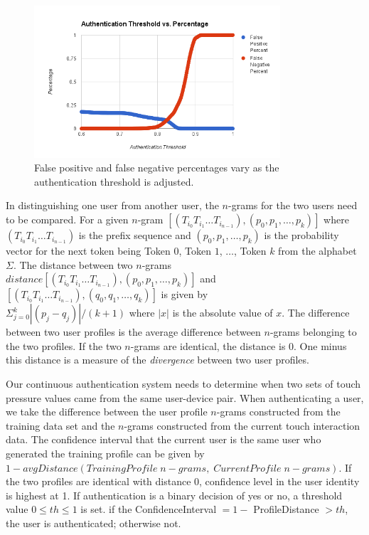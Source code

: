 \documentclass{acm_proc_article-sp}
\begin{document}
\begin{figure}
\centering
\includegraphics[width=3.6in]{threshold_vs_percentages.png}
\caption{False positive and false negative percentages vary as the authentication threshold is adjusted.}
\label{fig:threshold_vs_percentages}
\end{figure}

In distinguishing one user from another user, 
the $n$-grams for the two users need to be compared. 
For a given $n$-gram 
$[(T_{i_0} T_{i_1} \dots T_{i_{n-1}}), (p_0, p_1, \dots, p_k)]$ where 
$(T_{i_0} T_{i_1} \dots T_{i_{n-1}})$ is the prefix sequence and 
$(p_0, p_1, \dots, p_k)$ is the
probability vector for the next token being 
Token $0$, Token $1$, $\dots$, Token $k$ from the alphabet $\Sigma$.
The distance between two $n$-grams 
$distance[(T_{i_0} T_{i_1} \dots T_{i_{n-1}}), (p_0, p_1, \dots, p_k)]$ and \\
$[(T_{i_0} T_{i_1} \dots T_{i_{n-1}}), (q_0, q_1, \dots, q_k)]$ is given by \\
$\Sigma_{j=0}^k|(p_j - q_j)|/(k+1)$ where $|x|$ is the absolute value of $x$.
The difference between two user profiles is 
the average difference between $n$-grams belonging
to the two profiles.
If the two $n$-grams are identical, the distance is 0.
One minus this distance is a measure of the {\it divergence} between two user profiles.

Our continuous authentication system needs to determine 
when two sets of touch pressure values came from the same user-device pair. 
When authenticating a user, we take the difference between
the user profile $n$-grams constructed from the training data set 
and the $n$-grams constructed from the current touch interaction data.
The confidence interval that the current user is the same 
user who generated the training profile can be given by 
$1 - avgDistance(TrainingProfile \; n-grams, \; CurrentProfile \; n-grams)$. 
If the two profiles are identical with distance 0, 
confidence level in the user identity is highest at 1.
%
If authentication is a binary decision of yes or no, a threshold value $0 \leq th \leq 1$ is set.
if the ConfidenceInterval $= 1 -$ ProfileDistance $> th$, the user is authenticated; otherwise not. 
\end{document}
